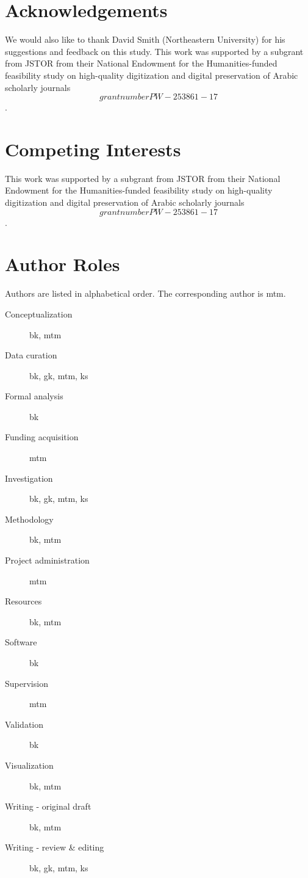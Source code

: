 
\section*{Acknowledgements}

We would also like to thank David Smith (Northeastern University) for his
suggestions and feedback on this study. This work was supported by a subgrant
from JSTOR from their National Endowment for the Humanities-funded feasibility
study on high-quality digitization and digital preservation of Arabic scholarly
journals \[grant number PW-253861-17\].


\section*{Competing Interests}

This work was supported by a subgrant from JSTOR from their National Endowment
for the Humanities-funded feasibility study on high-quality digitization and
digital preservation of Arabic scholarly journals \[grant number PW-253861-17\].

\section*{Author Roles}

Authors are listed in alphabetical order. The corresponding author is mtm.
\begin{description}
\item[Conceptualization] bk, mtm
\item[Data curation] bk, gk, mtm, ks
\item[Formal analysis] bk
\item[Funding acquisition] mtm
\item[Investigation] bk, gk, mtm, ks
\item[Methodology] bk, mtm
\item[Project administration] mtm
\item[Resources] bk, mtm
\item[Software] bk
\item[Supervision] mtm
\item[Validation] bk
\item[Visualization] bk, mtm
\item[Writing - original draft] bk, mtm
\item[Writing - review \& editing] bk, gk, mtm, ks
\end{description}
